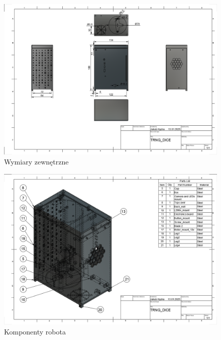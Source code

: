 \begin{figure}[H]
    \centering
    \includegraphics[width=0.95\linewidth]{chapters/03-praca-wlasna/figures/wymiary.png}
    \caption{\label{fig:wymiary}Wymiary zewnętrzne}
\end{figure}

\begin{figure}[H]
    \centering
    \includegraphics[width=0.95\linewidth]{chapters/03-praca-wlasna/figures/komponenty.png}
    \caption{\label{fig:komponenty}Komponenty robota}
\end{figure}

